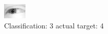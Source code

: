 \begin{figure}[h!]
\begin{center}
\includegraphics[width=0.60\columnwidth]{figures/ID2404_class_3_target_4.png}
\end{center}
\caption{ Classification: 3 actual target: 4}
\label{fig:ID2404_class_3_target_4}
\end{figure}
